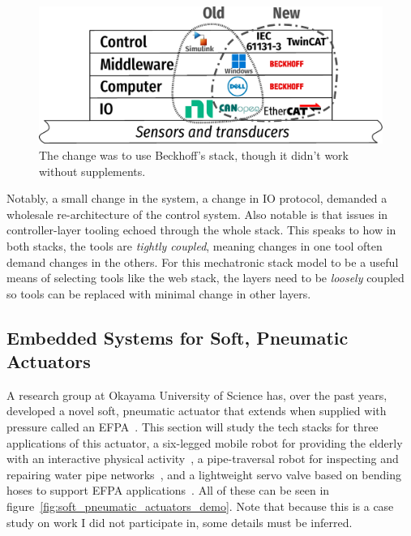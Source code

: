 \documentclass[english,12pt,a4paper,pdftex,eng,utf8]{aaltothesis}
\begin{document}
\begin{figure}[t]
  \centering
  \includegraphics[width=\textwidth]{assets/mechatronic_tech_stack_dolores}
  \caption{The change was to use Beckhoff's stack, though it didn't work without supplements.}\label{fig:mechatronic_tech_stack_dolores}
\end{figure}

Notably, a small change in the system, a change in IO protocol, demanded a wholesale re-architecture of the control system. Also notable is that issues in controller-layer tooling echoed through the whole stack. This speaks to how in both stacks, the tools are \textit{tightly coupled}, meaning changes in one tool often demand changes in the others. For this mechatronic stack model to be a useful means of selecting tools like the web stack, the layers need to be \textit{loosely} coupled so tools can be replaced with minimal change in other layers.

\subsection{Embedded Systems for Soft, Pneumatic Actuators}

A research group at Okayama University of Science has, over the past years, developed a novel soft, pneumatic actuator that extends when supplied with pressure called an EFPA~\cite{Noritsugu2005}. This section will study the tech stacks for three applications of this actuator, a six-legged mobile robot for providing the elderly with an interactive physical activity~\cite{Hase2020}, a pipe-traversal robot for inspecting and repairing water pipe networks~\cite{Shinohara2020}, and a lightweight servo valve based on bending hoses to support EFPA applications~\cite{Kobayashi2020}. All of these can be seen in figure~\ref{fig:soft_pneumatic_actuators_demo}. Note that because this is a case study on work I did not participate in, some details must be inferred.
\end{document}
